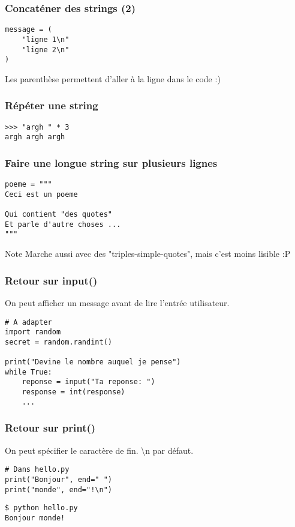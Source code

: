 \documentclass{beamer}
\begin{document}
\begin{frame}[fragile]
  \frametitle{Concaténer des strings (2)}
\begin{lstlisting}
message = (
    "ligne 1\n"
    "ligne 2\n"
)
\end{lstlisting}

Les parenthèse permettent d'aller à la ligne dans le code :)

\end{frame}


\begin{frame}[fragile]
  \frametitle{Répéter une string}

\begin{lstlisting}
>>> "argh " * 3
argh argh argh
\end{lstlisting}

\end{frame}


\begin{frame}[fragile]
  \frametitle{Faire une longue string sur plusieurs lignes}

\begin{lstlisting}
poeme = """
Ceci est un poeme

Qui contient "des quotes"
Et parle d'autre choses ...
"""
\end{lstlisting}

\begin{block}{Note}
Marche aussi avec des "triples-simple-quotes", mais c'est moins lisible :P
\end{block}
\end{frame}



\begin{frame}[fragile]
  \frametitle{Retour sur input()}
On peut afficher un message avant de lire l'entrée utilisateur.

\begin{lstlisting}
# A adapter
import random
secret = random.randint()

print("Devine le nombre auquel je pense")
while True:
    reponse = input("Ta reponse: ")
    response = int(response)
    ...
\end{lstlisting}


\end{frame}

\begin{frame}[fragile]
  \frametitle{Retour sur print()}

On peut spécifier le caractère de fin. \textbackslash n par défaut.

\begin{lstlisting}
# Dans hello.py
print("Bonjour", end=" ")
print("monde", end="!\n")
\end{lstlisting}

\begin{lstlisting}
$ python hello.py
Bonjour monde!
\end{lstlisting}

\end{frame}
\end{document}
